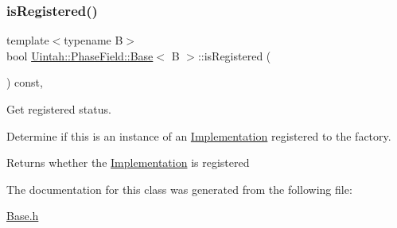 \mbox{\label{classUintah_1_1PhaseField_1_1Base_aead016aeee1f43fb7959158d7c9edb31}} 
\subsubsection{\texorpdfstring{is\+Registered()}{isRegistered()}}
{\footnotesize\ttfamily template$<$typename B$>$ \\
bool \hyperlink{classUintah_1_1PhaseField_1_1Base}{Uintah\+::\+Phase\+Field\+::\+Base}$<$ B $>$\+::is\+Registered (\begin{DoxyParamCaption}{ }\end{DoxyParamCaption}) const\hspace{0.3cm}{\ttfamily [inline]}, {\ttfamily [protected]}}



Get registered status. 

Determine if this is an instance of an \hyperlink{classUintah_1_1PhaseField_1_1Implementation}{Implementation} registered to the factory.

\begin{DoxyReturn}{Returns}
whether the \hyperlink{classUintah_1_1PhaseField_1_1Implementation}{Implementation} is registered 
\end{DoxyReturn}


The documentation for this class was generated from the following file\+:\begin{DoxyCompactItemize}
\item 
\hyperlink{Base_8h}{Base.\+h}\end{DoxyCompactItemize}
